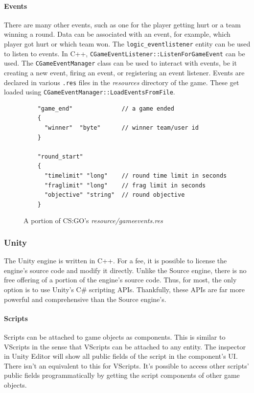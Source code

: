 \documentclass[a4paper, 12pt]{scrartcl}
\begin{document}
\paragraph{Events}
There are many other events, such as one for the player getting hurt or a team winning a round. Data can be associated with an event, for example, which player got hurt or which team won. The \texttt{logic\_eventlistener} entity can be used to listen to events. In C++, \texttt{CGameEventListener::ListenForGameEvent} can be used. The \texttt{CGameEventManager} class can be used to interact with events, be it creating a new event, firing an event, or registering an event listener. Events are declared in various \texttt{.res} files in the \textit{resources} directory of the game. These get loaded using \texttt{CGameEventManager::LoadEventsFromFile}.

\begin{figure}[!ht]
  \begin{verbatim}
    "game_end"              // a game ended
    {
      "winner"  "byte"      // winner team/user id
    }

    "round_start"
    {
      "timelimit" "long"    // round time limit in seconds
      "fraglimit" "long"    // frag limit in seconds
      "objective" "string"  // round objective
    }
  \end{verbatim}
  \caption{A portion of CS:GO's \textit{resource/gameevents.res}}
  \label{fig:source_gameevents}
\end{figure}

\subsubsection{Unity}
The Unity engine is written in C++. For a fee, it is possible to license the engine's source code and modify it directly. Unlike the Source engine, there is no free offering of a portion of the engine's source code. Thus, for most, the only option is to use Unity's C\# scripting APIs. Thankfully, these APIs are far more powerful and comprehensive than the Source engine's.

\paragraph{Scripts}
Scripts can be attached to game objects as components. This is similar to VScripts in the sense that VScripts can be attached to any entity. The inspector in Unity Editor will show all public fields of the script in the component's UI. There isn't an equivalent to this for VScripts. It's possible to access other scripts' public fields programmatically by getting the script components of other game objects.
\end{document}
